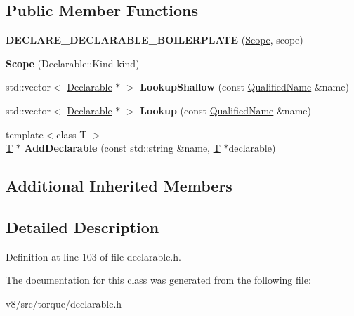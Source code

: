\subsection*{Public Member Functions}
\begin{DoxyCompactItemize}
\item 
\mbox{\label{classv8_1_1internal_1_1torque_1_1Scope_a8997790da7c3d6444cfd278e25883c13}} 
{\bfseries D\+E\+C\+L\+A\+R\+E\+\_\+\+D\+E\+C\+L\+A\+R\+A\+B\+L\+E\+\_\+\+B\+O\+I\+L\+E\+R\+P\+L\+A\+TE} (\mbox{\hyperlink{classv8_1_1internal_1_1torque_1_1Scope}{Scope}}, scope)
\item 
\mbox{\label{classv8_1_1internal_1_1torque_1_1Scope_acaee0026dfca24580f924f1408254e7f}} 
{\bfseries Scope} (Declarable\+::\+Kind kind)
\item 
\mbox{\label{classv8_1_1internal_1_1torque_1_1Scope_af7060e2c0ec7d0a1d593aa14d60dc0ae}} 
std\+::vector$<$ \mbox{\hyperlink{classv8_1_1internal_1_1torque_1_1Declarable}{Declarable}} $\ast$ $>$ {\bfseries Lookup\+Shallow} (const \mbox{\hyperlink{structv8_1_1internal_1_1torque_1_1QualifiedName}{Qualified\+Name}} \&name)
\item 
\mbox{\label{classv8_1_1internal_1_1torque_1_1Scope_a23570fd3082be660d5e855e76c91824b}} 
std\+::vector$<$ \mbox{\hyperlink{classv8_1_1internal_1_1torque_1_1Declarable}{Declarable}} $\ast$ $>$ {\bfseries Lookup} (const \mbox{\hyperlink{structv8_1_1internal_1_1torque_1_1QualifiedName}{Qualified\+Name}} \&name)
\item 
\mbox{\label{classv8_1_1internal_1_1torque_1_1Scope_a6c234a9894d027fe4bd40877934e0489}} 
{\footnotesize template$<$class T $>$ }\\\mbox{\hyperlink{classv8_1_1internal_1_1torque_1_1T}{T}} $\ast$ {\bfseries Add\+Declarable} (const std\+::string \&name, \mbox{\hyperlink{classv8_1_1internal_1_1torque_1_1T}{T}} $\ast$declarable)
\end{DoxyCompactItemize}
\subsection*{Additional Inherited Members}


\subsection{Detailed Description}


Definition at line 103 of file declarable.\+h.



The documentation for this class was generated from the following file\+:\begin{DoxyCompactItemize}
\item 
v8/src/torque/declarable.\+h\end{DoxyCompactItemize}
